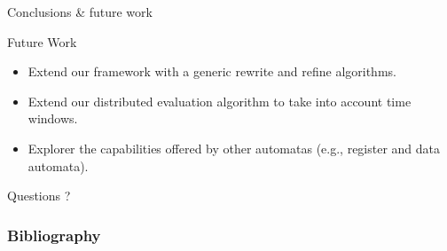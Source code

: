 \documentclass[xcolor=pdftex,dvipsnames,table]{beamer}
\begin{document}

\begin{frame}{Conclusions \& future work}
  \begin{block}{Future Work}
   \begin{itemize}
     \item Extend our framework with a generic rewrite and refine algorithms.
     \pause
     \item Extend our distributed evaluation algorithm to take into account time windows.
     \pause
     \item Explorer the capabilities offered by other automatas (e.g., register and data automata).
   \end{itemize}
  \end{block}
\end{frame}


\begin{frame}[c]{ }
  \centering
  \huge Questions ?
\end{frame}


\begin{frame}[allowframebreaks]
  \frametitle{Bibliography}
  
  
\end{frame}
\end{document}
